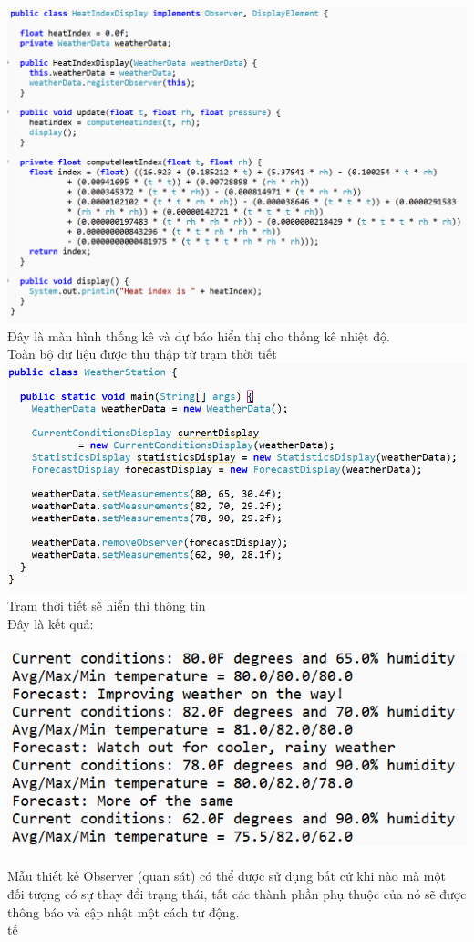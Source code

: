 \includegraphics[width=\columnwidth,height=.5\textheight]{GALLEYS/images/chapter2/images9}\\
Đây là màn hình thống kê và dự báo hiển thị cho thống kê nhiệt độ.\\
Toàn bộ dữ liệu được thu thập từ trạm thời tiết\\
\includegraphics[width=\columnwidth,height=.4\textheight]{GALLEYS/images/chapter2/images10}\\
Trạm thời tiết sẽ hiển thi thông tin\\
Đây là kết quả:\\\\
\includegraphics[width=\columnwidth,height=.3\textheight]{GALLEYS/images/chapter2/images11}\\\\
Mẫu thiết kế Observer (quan sát) có thể được sử dụng bất cứ khi nào mà một đối tượng có sự thay đổi trạng thái, tất các thành phần phụ thuộc của nó sẽ được thông báo và cập nhật một cách tự động.\\tế

